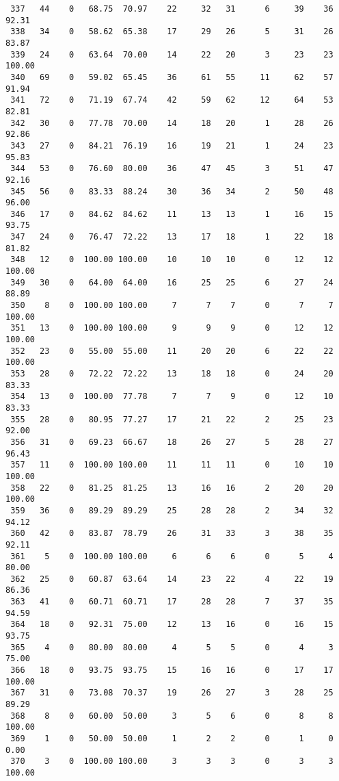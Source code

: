 \begin{verbatim}
 337   44    0   68.75  70.97    22     32   31      6     39    36    92.31
 338   34    0   58.62  65.38    17     29   26      5     31    26    83.87
 339   24    0   63.64  70.00    14     22   20      3     23    23   100.00
 340   69    0   59.02  65.45    36     61   55     11     62    57    91.94
 341   72    0   71.19  67.74    42     59   62     12     64    53    82.81
 342   30    0   77.78  70.00    14     18   20      1     28    26    92.86
 343   27    0   84.21  76.19    16     19   21      1     24    23    95.83
 344   53    0   76.60  80.00    36     47   45      3     51    47    92.16
 345   56    0   83.33  88.24    30     36   34      2     50    48    96.00
 346   17    0   84.62  84.62    11     13   13      1     16    15    93.75
 347   24    0   76.47  72.22    13     17   18      1     22    18    81.82
 348   12    0  100.00 100.00    10     10   10      0     12    12   100.00
 349   30    0   64.00  64.00    16     25   25      6     27    24    88.89
 350    8    0  100.00 100.00     7      7    7      0      7     7   100.00
 351   13    0  100.00 100.00     9      9    9      0     12    12   100.00
 352   23    0   55.00  55.00    11     20   20      6     22    22   100.00
 353   28    0   72.22  72.22    13     18   18      0     24    20    83.33
 354   13    0  100.00  77.78     7      7    9      0     12    10    83.33
 355   28    0   80.95  77.27    17     21   22      2     25    23    92.00
 356   31    0   69.23  66.67    18     26   27      5     28    27    96.43
 357   11    0  100.00 100.00    11     11   11      0     10    10   100.00
 358   22    0   81.25  81.25    13     16   16      2     20    20   100.00
 359   36    0   89.29  89.29    25     28   28      2     34    32    94.12
 360   42    0   83.87  78.79    26     31   33      3     38    35    92.11
 361    5    0  100.00 100.00     6      6    6      0      5     4    80.00
 362   25    0   60.87  63.64    14     23   22      4     22    19    86.36
 363   41    0   60.71  60.71    17     28   28      7     37    35    94.59
 364   18    0   92.31  75.00    12     13   16      0     16    15    93.75
 365    4    0   80.00  80.00     4      5    5      0      4     3    75.00
 366   18    0   93.75  93.75    15     16   16      0     17    17   100.00
 367   31    0   73.08  70.37    19     26   27      3     28    25    89.29
 368    8    0   60.00  50.00     3      5    6      0      8     8   100.00
 369    1    0   50.00  50.00     1      2    2      0      1     0     0.00
 370    3    0  100.00 100.00     3      3    3      0      3     3   100.00

\end{verbatim}

